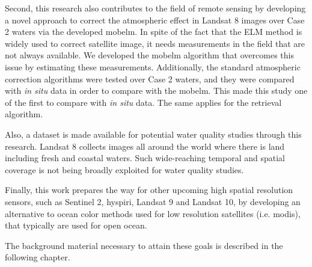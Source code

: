 Second, this research also contributes to the field of remote sensing by developing a novel approach to correct the atmospheric effect in Landsat 8 images over Case 2 waters via the developed \gls{mobelm}. In spite of the fact that the ELM method is widely used to correct satellite image, it needs measurements in the field that are not always available. We developed the \gls{mobelm} algorithm that overcomes this issue by estimating these measurements. Additionally, the standard atmospheric correction algorithms were tested over Case 2 waters, and they were compared with {\it in situ} data in order to compare with the \gls{mobelm}. This made this study one of the first to compare with {\it in situ} data. The same applies for the retrieval algorithm.

Also, a dataset is made available for potential water quality studies through this research. Landsat 8 collects images all around the world where there is land including fresh and coastal waters. Such wide-reaching temporal and spatial coverage is not being broadly exploited for water quality studies.

Finally, this work prepares the way for other upcoming high spatial resolution sensors, such as Sentinel 2, \gls{hyspiri}, Landsat 9 and Landsat 10, by developing an alternative to ocean color methods used for low resolution satellites (i.e. \gls{modis}), that typically are used for open ocean.


The background material necessary to attain these goals is described in the following chapter.
